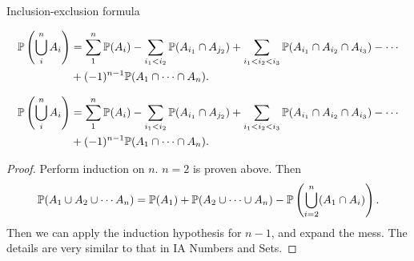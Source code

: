 %
\begin{note}
  \begin{field}
    Inclusion-exclusion formula
  \end{field}
  \begin{field}
    \begin{thm}
      \begin{align*}
        \P\left(\bigcup_i^n A_i\right) &= \sum_1^n \P(A_i) - \sum_{i_1 < i_2} \P(A_{i_1}\cap A_{j_2}) + \sum_{i_1 < i_2 < i_3}\P(A_{i_1}\cap A_{i_2} \cap A_{i_3}) - \cdots\\
        &+ (-1)^{n - 1} \P(A_1\cap \cdots \cap A_n).
      \end{align*}
    \end{thm}
  \end{field}
  \xplain{}%
\end{note}

%
\begin{note}
  \begin{field}
    \begin{thm}
      \begin{align*}
        \P\left(\bigcup_i^n A_i\right) &= \sum_1^n \P(A_i) - \sum_{i_1 < i_2} \P(A_{i_1}\cap A_{j_2}) + \sum_{i_1 < i_2 < i_3}\P(A_{i_1}\cap A_{i_2} \cap A_{i_3}) - \cdots\\
        &+ (-1)^{n - 1} \P(A_1\cap \cdots \cap A_n).
      \end{align*}
    \end{thm}
  \end{field}
  \begin{field}
    \begin{proof}
      Perform induction on $n$. $n = 2$ is proven above.
      Then
      \[
        \P(A_1\cup A_2\cup \cdots A_n) = \P(A_1) + \P(A_2\cup\cdots\cup A_n) - \P\left(\bigcup_{i = 2}^n (A_1\cap A_i)\right).
      \]
      Then we can apply the induction hypothesis for $n - 1$, and expand the mess. The details are very similar to that in IA Numbers and Sets.
    \end{proof}
  \end{field}
  \xplain{}%
\end{note}

